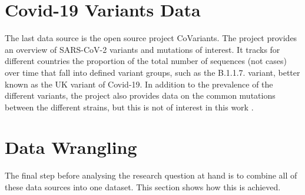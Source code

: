 \section{Covid-19 Variants Data}
The last data source is the open source project CoVariants. The project provides an overview of SARS-CoV-2 variants and mutations of interest. It tracks for different countries the proportion of the total number of sequences (not cases) over time that fall into defined variant groups, such as the B.1.1.7. variant, better known as the UK variant of Covid-19. In addition to the prevalence of the different variants, the project also provides data on the common mutations between the different strains, but this is not of interest in this work \autocite[][]{hodcroft2021covariants}.
\clearpage
\section{Data Wrangling}
The final step before analysing the research question at hand is to combine all of these data sources into one dataset. This section shows how this is achieved.
